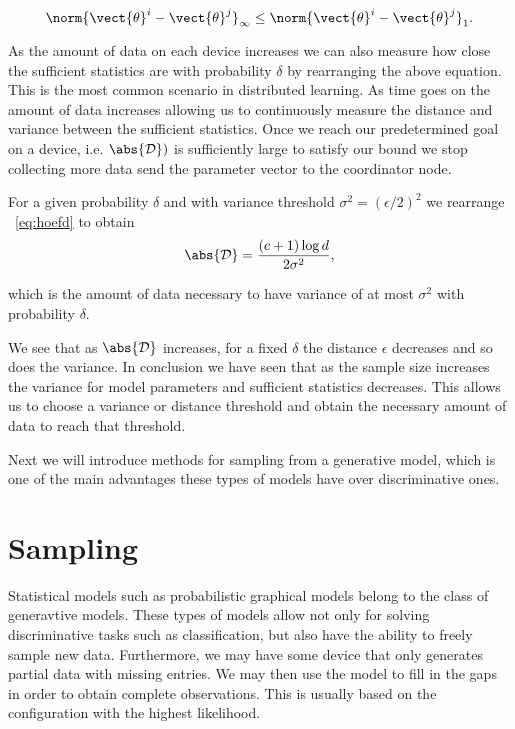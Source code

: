 \begin{equation}
    \norm{\vect{\theta}^i- \vect{\theta}^j}_{\infty}  \leq \norm{\vect{\theta}^i- \vect{\theta}^j}_1.
\end{equation}

As the amount of data on each device increases we can also measure how close the sufficient statistics are with probability $\delta$ by rearranging the above equation. 
This is the most common scenario in distributed learning. As time goes on the amount of data increases allowing us to continuously measure the distance and variance between the sufficient statistics.
Once we reach our predetermined goal on a device, i.e. $\abs{\mathcal{D}}^^i$ is sufficiently large to satisfy our bound we stop collecting more data send the parameter vector to the coordinator node.

For a given probability $\delta$ and with variance threshold $\sigma^2 = (\epsilon/2)^2$ we rearrange \eq~\ref{eq:hoefd} to obtain 
\begin{equation}
    \abs{\mathcal{D}} = \frac{(c+1) \log d}{2 \sigma^2},
\end{equation}

which is the amount of data necessary to have variance  of at most $\sigma^2$ with probability $\delta$.

We see that as $\abs{\mathcal{D}}$ increases, for a fixed $\delta$ the distance $\epsilon$ decreases and so does the variance. 
In conclusion we have seen that as the sample size increases the variance for model parameters and sufficient statistics decreases.
This allows us to choose a variance or distance threshold and obtain the necessary amount of data to reach that threshold.

Next we will introduce methods for sampling from a generative model, which is one of the main advantages these types of models have over discriminative ones.

\section{Sampling}
Statistical models such as probabilistic graphical models belong to the class of generavtive models.
These types of models allow not only for solving discriminative tasks such as classification, but also have the ability to freely sample new data.
Furthermore, we may have some device that only generates partial data with missing entries.
We may then use the model to fill in the gaps in order to obtain complete observations.
This is usually based on the configuration with the highest likelihood.

